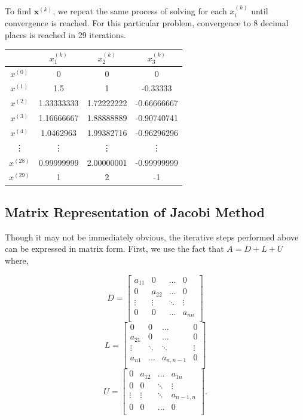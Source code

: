 To find $\mathbf{x}^{(k)}$, we repeat the same process of solving for each
$x^{(k)}_i$ until convergence is reached. For this particular problem,
convergence to 8 decimal places is reached in 29 iterations.

\begin{center}
\begin{tabular}{ c|c c c  }
          & $x^{(k)}_1$ & $x^{(k)}_2$ & $x^{(k)}_3$ \\
    \hline
    $x^{(0)}$ & 0 & 0 & 0 \\
    $x^{(1)}$ & 1.5 & 1 & -0.33333 \\
    $x^{(2)}$ & 1.33333333 & 1.72222222 & -0.66666667 \\
    $x^{(3)}$ & 1.16666667 & 1.88888889 & -0.90740741 \\
    $x^{(4)}$ & 1.0462963 & 1.99382716 & -0.96296296 \\
    \vdots    & \vdots    & \vdots     & \vdots     \\
    $x^{(28)}$ & 0.99999999 & 2.00000001 & -0.99999999 \\
    $x^{(29)}$ & 1 & 2 & -1 \\
\end{tabular}
\end{center}


\subsection*{Matrix Representation of Jacobi Method} %

Though it may not be immediately obvious, the iterative steps performed above
can be expressed in matrix form. First, we use the fact that
$A = D + L + U$ where,

$$
D = \begin{bmatrix}
a_{11} & 0 & \ldots & 0 \\
0 & a_{22} & \ldots & 0 \\
 \vdots & \vdots & \ddots & \vdots \\
0 & 0 & \ldots & a_{nn} \\
\end{bmatrix}
$$
$$
L = \begin{bmatrix}
0 & 0 & \ldots & 0 \\
a_{21} &  0 & \ldots & 0\\
 \vdots & \ddots & \ddots & \vdots \\
a_{n1} & \ldots & a_{n,n-1} & 0 \\
\end{bmatrix}
$$
$$
U = \begin{bmatrix}
0 & a_{12} & \ldots & a_{1n} \\
0 & 0 & \ddots & \vdots \\
 \vdots & \vdots & \ddots & a_{n-1,n} \\
0 & 0 & \ldots & 0 \\
\end{bmatrix}.
$$

